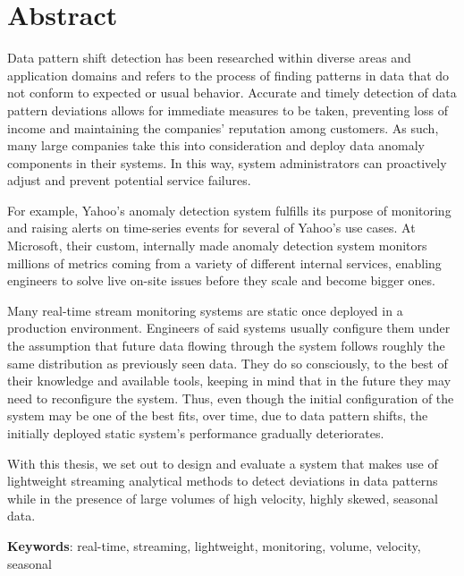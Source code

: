 \chapter*{Abstract}
 
Data pattern shift detection has been researched within diverse areas and application domains and refers to the process of finding patterns in data that do not conform to expected or usual behavior. Accurate and timely detection of data pattern deviations allows for immediate measures to be taken, preventing loss of income and maintaining the companies' reputation among customers.
As such, many large companies take this into consideration and deploy data anomaly components in their systems. In this way, system administrators can proactively adjust and prevent potential service failures.

For example, Yahoo's anomaly detection system fulfills its purpose of monitoring and raising alerts on time-series events for several of Yahoo's use cases. At Microsoft, their custom, internally made anomaly detection system monitors millions of metrics coming from a variety of different internal services, enabling engineers to solve live on-site issues before they scale and become bigger ones.

Many real-time stream monitoring systems are static once deployed in a production environment. Engineers of said systems usually configure them under the assumption that future data flowing through the system follows roughly the same distribution as previously seen data. They do so consciously, to the best of their knowledge and available tools, keeping in mind that in the future they may need to reconfigure the system. Thus, even though the initial configuration of the system may be one of the best fits, over time, due to data pattern shifts, the initially deployed static system's performance gradually deteriorates.

With this thesis, we set out to design and evaluate a system that makes use of lightweight streaming analytical methods to detect deviations in data patterns while in the presence of large volumes of high velocity, highly skewed, seasonal data. 

\vspace*{10mm}\noindent
\textbf{Keywords}: real-time, streaming, lightweight, monitoring, volume, velocity, seasonal

